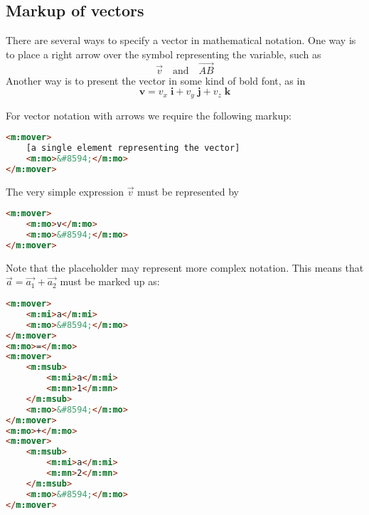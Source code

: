 \documentclass[english,a4paper,11pt]{article}
\begin{document}
\subsection{Markup of vectors}
There are several ways to specify a vector in mathematical notation. One way is to place a right arrow over the symbol representing the variable, such as 
\begin{equation}
\vec{v}\quad \text{and}\quad \overrightarrow{AB}
\end{equation}
Another way is to present the vector in some kind of bold font, as in 
\begin{equation}
\mathbf{v} = v_x\;  \mathbf{i} + v_y\; \mathbf{j} + v_z\;  \mathbf{k}
\end{equation}

\bigskip
For vector notation with arrows we require the following markup:
\begin{lstlisting}[language=HTML]
<m:mover>
	[a single element representing the vector]
	<m:mo>&#8594;</m:mo>
</m:mover>
\end{lstlisting}

\begin{eksempler}
The very simple expression $\vec{v}$ must be represented by
\begin{lstlisting}[language=HTML]
<m:mover>
	<m:mo>v</m:mo>
	<m:mo>&#8594;</m:mo>
</m:mover>
\end{lstlisting}
Note that the placeholder  may represent more complex notation. This means that $\vec{a} = \vec{a_1} + \vec{a_2}$ must be marked up as:
\begin{lstlisting}[language=HTML]
<m:mover>
	<m:mi>a</m:mi>
	<m:mo>&#8594;</m:mo>
</m:mover>
<m:mo>=</m:mo>
<m:mover>
	<m:msub>
		<m:mi>a</m:mi>
		<m:mn>1</m:mn>
	</m:msub>
	<m:mo>&#8594;</m:mo>
</m:mover>
<m:mo>+</m:mo>
<m:mover>
	<m:msub>
		<m:mi>a</m:mi>
		<m:mn>2</m:mn>
	</m:msub>
	<m:mo>&#8594;</m:mo>
</m:mover>
\end{lstlisting}
\end{eksempler}
\end{document}
